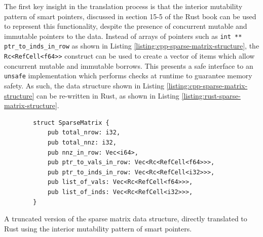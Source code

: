 The first key insight in the translation process is that the interior mutability pattern of smart pointers, discussed in section 15-5 of the Rust book \cite{RustProgrammingLanguage} can be used to represent this functionality, despite the presence of concurrent mutable and immutable pointers to the data. Instead of arrays of pointers such as \texttt{int ** ptr_to_inds_in_row} as shown in Listing \ref{listing:cpp-sparse-matrix-structure}, the \texttt{Rc<RefCell<f64>>} construct can be used to create a vector of items which allow concurrent mutable and immutable borrows. This presents a safe interface to an \texttt{unsafe} implementation which performs checks at runtime to guarantee memory safety. As such, the data structure shown in Listing \ref{listing:cpp-sparse-matrix-structure} can be re-written in Rust, as shown in Listing \ref{listing:rust-sparse-matrix-structure}.

\begin{code}
    \begin{verbatim}
        struct SparseMatrix {
            pub total_nrow: i32,
            pub total_nnz: i32,
            pub nnz_in_row: Vec<i64>,
            pub ptr_to_vals_in_row: Vec<Rc<RefCell<f64>>>,
            pub ptr_to_inds_in_row: Vec<Rc<RefCell<i32>>>,
            pub list_of_vals: Vec<Rc<RefCell<f64>>>,
            pub list_of_inds: Vec<Rc<RefCell<i32>>>,
        }
    \end{verbatim}
    \caption{A truncated version of the sparse matrix data structure, directly translated to Rust using the interior mutability pattern of smart pointers.}
    \label{listing:rust-sparse-matrix-structure}
\end{code}


